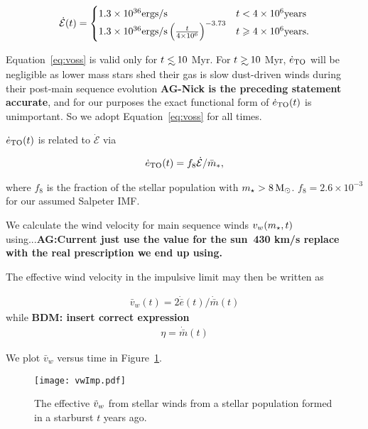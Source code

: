\begin{align}
\dot{\mathcal{E}} (t)=
\begin{cases}
  1.3 \times 10^{36} {\rm ergs/s} & t<4 \times 10^6 {\rm years}\\
  1.3  \times 10^{36} {\rm ergs/s} \left(\frac{t}{4 \times  10^6}\right)^{-3.73} & t \ge 4 \times 10^6 {\rm years}.
\end{cases}
\label{eq:voss}
\end{align}

Equation~\eqref{eq:voss} is valid only for $t \lsim 10$ Myr. For $t\gsim
10$ Myr, $\dot{e}_{\rm TO}$ will be negligible as lower mass stars
shed their gas is slow dust-driven winds during their post-main
sequence evolution {\bf AG-Nick is the preceding statement accurate},
and for our purposes the exact functional form of $\dot{e}_{\rm
  TO}(t)$ is unimportant. So we adopt Equation~\eqref{eq:voss} for all times.

 $\dot{e}_{\rm TO}(t)$ is related to $\dot{\mathcal{E}}$  via 

\begin{align}
\dot{e}_{\rm TO}(t)=f_{8} \dot{\mathcal{E}} / \bar{m}_*,
\label{eq:eto}
\end{align}

where $f_{8}$ is the fraction of the stellar population with $m_{\star}>8
\,{\rm M_\odot}$. $f_8=2.6 \times 10^{-3}$ for our assumed Salpeter IMF.


We calculate the wind velocity for main sequence winds $v_w (m_{\star},
t)$ using...{\bf AG:Current just use the value for the sun~430 km/s
  replace with the real prescription we end up using.}

The effective wind velocity in the impulsive limit may then be written
as 

\begin{align}
\bar{v}_w(t)=2 \dot{\bar{e}}(t)/\dot{\bar{m}}(t)
\label{eq:vwImp}
\end{align}
while {\bf BDM: insert correct expression}
\begin{align}
\eta = \dot{\bar{m}}(t)
\label{eq:vwImp}
\end{align}

We plot $\bar{v}_w$ versus time in Figure~\ref{fig:vwImp}.

\begin{figure}
\texttt{[image: vwImp.pdf]}
\caption{\label{fig:vwImp} The effective $\tilde{v}_{w}$ from stellar winds from
  a stellar population formed in a starburst $t$ years ago.}
\end{figure}


